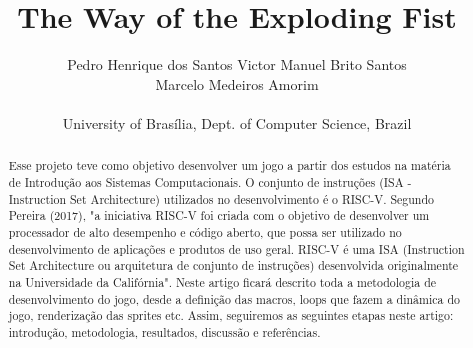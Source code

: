 \documentclass[a4paper]{sbgames}
\begin{document}
\title{The Way of the Exploding Fist}



 \author{ Pedro Henrique dos Santos 
         \hspace{28pt} Victor Manuel Brito Santos \\
         \hspace{28pt} Marcelo Medeiros Amorim \\
         \vspace{0pt} \\
         {University of Brasília, Dept. of Computer Science, Brazil} }
        





\maketitle

\setlength{\parindent}{4em}
\setlength{\parskip}{1em}

\begin{abstract}
Esse projeto teve como objetivo desenvolver um jogo a partir dos estudos na matéria de Introdução aos Sistemas Computacionais. O conjunto de instruções (ISA - Instruction Set Architecture) utilizados no desenvolvimento é o RISC-V. Segundo Pereira (2017), "a iniciativa RISC-V foi criada com o objetivo de desenvolver um processador de alto desempenho e código aberto, que possa ser utilizado no desenvolvimento de aplicações e produtos de uso geral. RISC-V é uma ISA (Instruction Set Architecture ou arquitetura de conjunto de instruções) desenvolvida originalmente na Universidade da Califórnia". Neste artigo ficará descrito toda a metodologia de desenvolvimento do jogo, desde a definição das macros, loops que fazem a dinâmica do jogo, renderização das sprites etc. Assim, seguiremos as seguintes etapas neste artigo: introdução, metodologia, resultados, discussão e referências.

\end{abstract}
\end{document}
